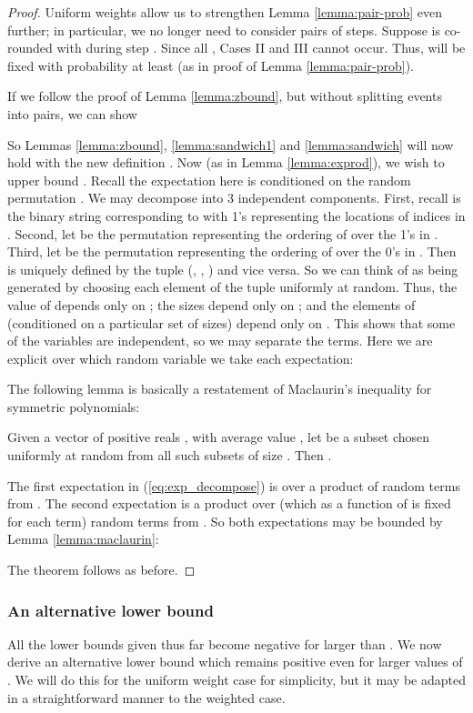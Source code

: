 \begin{proof}
Uniform weights allow us to strengthen Lemma \ref{lemma:pair-prob} even further; in particular, we no longer need to consider pairs of steps. Suppose  is co-rounded with  during step . Since all , Cases II and III cannot occur. Thus,  will be fixed with probability at least  (as in proof of Lemma \ref{lemma:pair-prob}).

If we follow the proof of Lemma \ref{lemma:zbound}, but without splitting events into pairs, we can show

So Lemmas \ref{lemma:zbound}, \ref{lemma:sandwich1} and \ref{lemma:sandwich} will now hold with the new definition . Now (as in Lemma \ref{lemma:exprod}), we wish to upper bound . Recall the expectation here is conditioned on the random permutation . We may decompose  into 3 independent components. First, recall  is the binary string corresponding to  with  1's representing the locations of indices in . Second, let  be the permutation representing the ordering of  over the 1's in . Third, let  be the permutation representing the ordering of  over the 0's in . Then  is uniquely defined by the tuple (, , ) and vice versa. So we can think of  as being generated by choosing each element of the tuple uniformly at random. 
Thus, the value of  depends only on ; the sizes  depend only on ; and the elements of  (conditioned on a particular set of sizes) depend only on . This shows that some of the variables are independent, so we may separate the terms. Here we are explicit over which random variable we take each expectation:

The following lemma is basically a restatement of Maclaurin's inequality for symmetric polynomials:
\begin{lemma}\label{lemma:maclaurin}
Given a vector of positive reals , with average value , let  be a subset chosen uniformly at random from all such subsets of size . Then .
\end{lemma}
The first expectation in (\ref{eq:exp_decompose}) is over a product of  random terms from . The second expectation is a product over  (which as a function of  is fixed for each term) random terms from . So both expectations may be bounded by Lemma \ref{lemma:maclaurin}:

The theorem follows as before.
\end{proof}

\subsubsection{An alternative lower bound}
All the lower bounds given thus far become negative for  larger than . We now derive an alternative lower bound which remains positive even for larger values of . We will do this for the uniform weight case for simplicity, but it may be adapted in a straightforward manner to the weighted case. 

